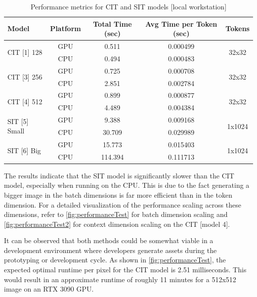     \begin{table}[H]
        \centering
        \small
        \begin{tabular}{|l|c|c|c|c|}
        \hline
        \textbf{Model} & \textbf{Platform} & \textbf{Total Time (sec)} & \textbf{Avg Time per Token (sec)} & \textbf{Tokens} \\ \hline
        \multirow{2}{*}{CIT [1] 128} & GPU & 0.511 & 0.000499 & \multirow{2}{*}{32x32} \\ \cline{2-4}
                                           & CPU  & 0.494 & 0.000483 &  \\ \hline
        \multirow{2}{*}{CIT [3] 256} & GPU & 0.725 & 0.000708 & \multirow{2}{*}{32x32} \\ \cline{2-4}
                                           & CPU  & 2.851 & 0.002784 &  \\ \hline
        \multirow{2}{*}{CIT [4] 512} & GPU & 0.899 & 0.000877 & \multirow{2}{*}{32x32} \\ \cline{2-4}
                                           & CPU  & 4.489 & 0.004384 &  \\ \hline
        \multirow{2}{*}{SIT [5] Small} & GPU & 9.388 & 0.009168 & \multirow{2}{*}{1x1024} \\ \cline{2-4}
                                             & CPU  & 30.709 & 0.029989 &  \\ \hline
        \multirow{2}{*}{SIT [6] Big} & GPU & 15.773 & 0.015403 & \multirow{2}{*}{1x1024} \\ \cline{2-4}
                                           & CPU  & 114.394 & 0.111713 &  \\ \hline
        \end{tabular}
        \caption{Performance metrics for CIT and SIT models [local workstation]}
        \label{tab:performance_metrics}
    \end{table}
        
    The results indicate that the SIT model is significantly slower than the CIT model, especially when running on the CPU. This is due to the fact generating a bigger image in the batch dimensions is far more efficient than in the token dimension. For a detailed visualization of the performance scaling across these dimensions, refer to \autoref{fig:performanceTest} for batch dimension scaling and \autoref{fig:performanceTest2} for context dimension scaling on the CIT [model 4].

    It can be observed that both methods could be somewhat viable in a development environment where developers generate assets during the prototyping or development cycle. As shown in \autoref{fig:performanceTest}, the expected optimal runtime per pixel for the CIT model is 2.51 milliseconds. This would result in an approximate runtime of roughly 11 minutes for a 512x512 image on an RTX 3090 GPU.
    
